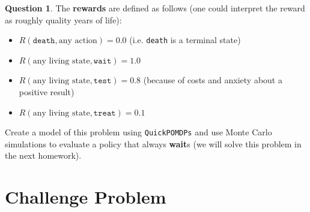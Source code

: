 \documentclass{article}
\theoremstyle{definition}
\newtheorem{question}[thm]{Question}
\begin{document}
\begin{question}
The \textbf{rewards} are defined as follows (one could interpret the reward as roughly quality years of life):
\begin{itemize}[noitemsep]
    \item $R(\texttt{death}, \text{any action}) = 0.0$ (i.e. \texttt{death} is a terminal state)
    \item $R(\text{any living state}, \texttt{wait}) = 1.0$
    \item $R(\text{any living state}, \texttt{test}) = 0.8$ (because of costs and anxiety about a positive result)
    \item $R(\text{any living state}, \texttt{treat}) = 0.1$
\end{itemize}

Create a model of this problem using \texttt{QuickPOMDPs} and use Monte Carlo simulations to evaluate a policy that always \textbf{wait}s (we will solve this problem in the next homework).

\end{question}


\clearpage

\section{Challenge Problem}
\end{document}
